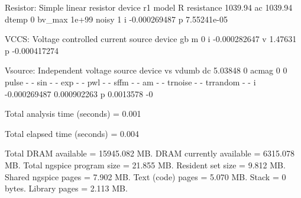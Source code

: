  Resistor: Simple linear resistor
     device                    r1
      model                     R
 resistance               1039.94
         ac               1039.94
      dtemp                     0
     bv_max                 1e+99
      noisy                     1
          i          -0.000269487
          p           7.55241e-05

 VCCS: Voltage controlled current source
     device                    gb
          m                     0
          i          -0.000282647
          v               1.47631
          p          -0.000417274

 Vsource: Independent voltage source
     device                    vs                 vdumb
         dc               5.03848                     0
      acmag                     0                     0
      pulse         -         -
        sin         -         -
        exp         -         -
        pwl         -         -
       sffm         -         -
         am         -         -
    trnoise         -         -
   trrandom         -         -
          i          -0.000269487           0.000902263
          p             0.0013578                    -0


Total analysis time (seconds) = 0.001

Total elapsed time (seconds) = 0.004 

Total DRAM available = 15945.082 MB.
DRAM currently available = 6315.078 MB.
Total ngspice program size =   21.855 MB.
Resident set size =    9.812 MB.
Shared ngspice pages =    7.902 MB.
Text (code) pages =    5.070 MB.
Stack = 0 bytes.
Library pages =    2.113 MB.

